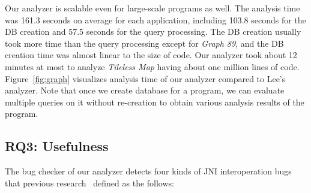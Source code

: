 Our analyzer is scalable even for large-scale programs as well. The analysis
time was 161.3 seconds on average for each application, including 103.8 seconds
for the DB creation and 57.5 seconds for the query processing. The DB creation
usually took more time than the query processing except for {\it Graph 89}, and
the DB creation time was almost linear to the size of code. Our analyzer took
about 12 minutes at most to analyze {\it Tileless Map} having about one million
lines of code. Figure~\ref{fig:graph} visualizes analysis time of our analyzer
compared to Lee's analyzer.   Note
that once we create database for a program, we can evaluate multiple queries on
it without re-creation to obtain various analysis results of the program.





\subsection{RQ3: Usefulness}

The bug checker of our analyzer detects four kinds of JNI interoperation bugs
that previous research~\cite{ILEA, LeeASE20} defined as the follows:


